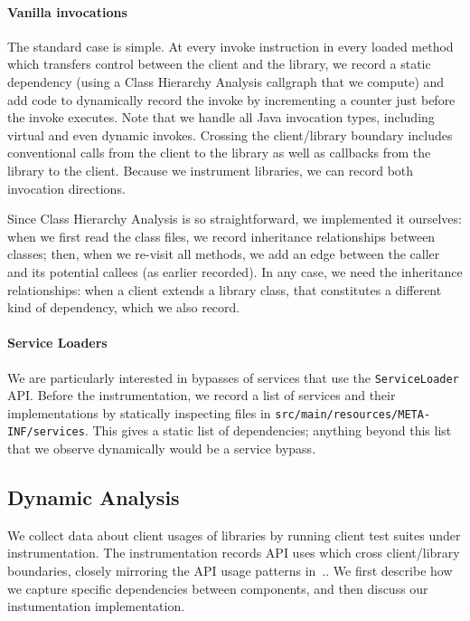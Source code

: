 \paragraph{Vanilla invocations}
The standard case is simple. At every invoke instruction in every
loaded method which transfers control between the client and the
library, we record a static dependency (using a Class Hierarchy
Analysis callgraph that we compute) and add code to dynamically record
the invoke by incrementing a counter just before the invoke
executes. Note that we handle all Java invocation types, including
virtual and even dynamic invokes. Crossing the client/library boundary
includes conventional calls from the client to the library as well as
callbacks from the library to the client.  Because we instrument
libraries, we can record both invocation directions.

Since Class Hierarchy Analysis is so straightforward, we implemented
it ourselves: when we first read the class files, we record
inheritance relationships between classes; then, when we re-visit all
methods, we add an edge between the caller and its potential callees
(as earlier recorded).  In any case, we need the inheritance
relationships: when a client extends a library class, that constitutes
a different kind of dependency, which we also record.

\paragraph{Service Loaders} We are particularly interested in bypasses of 
services that use the \texttt{ServiceLoader} API. Before the instrumentation, we record a list 
of services and their implementations by statically inspecting files in \texttt{src/main/resources/META-INF/services}. This gives a static list of dependencies; anything beyond this list that we observe dynamically would be a service bypass.

\subsection{Dynamic Analysis}
\label{subsec:dynamic}
We collect data about client usages of libraries by running client
test suites under instrumentation. The instrumentation records API
uses which cross client/library boundaries, closely mirroring the API
usage patterns
in~\cite{venkatanarayanan22:_study_lever_api_usage_patter}.. We first
describe how we capture specific dependencies between components, and
then discuss our instumentation implementation.

